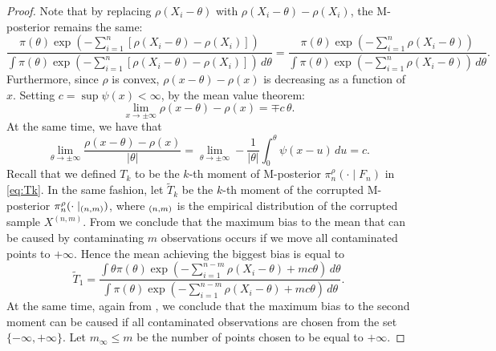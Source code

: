 \documentclass[11pt, oneside]{amsart}
\theoremstyle{definition}   %
\let\P\relax
\newcommand{\P}{\mathbb{P}}
\newcommand{\loss}{\rho}
\newcommand{\mposterior}{\pi_n^{\loss}}
\newcommand{\corruptedsample}{X^{(n,m)}}
\begin{document}
\begin{proof}
    Note that by replacing \( \loss(X_i - \theta)\) with \( \loss(X_i - \theta) - \loss(X_i)\), the M-posterior remains the same:
    \begin{equation}
    \label{eq:diff}
        \frac{\pi(\theta) \exp \left ( - \sum_{i=1}^n [ \loss(X_i - \theta) - \loss(X_i)]  \right )}{\int \pi(\theta) \exp \left ( - \sum_{i=1}^n [ \loss(X_i - \theta) - \loss(X_i)]  \right ) \, d\theta}
        =
        \frac{\pi(\theta) \exp \left ( - \sum_{i=1}^n\loss(X_i - \theta)  \right )}{\int \pi(\theta) \exp \left ( - \sum_{i=1}^n \loss(X_i - \theta)   \right ) \, d\theta}.
    \end{equation}
    Furthermore, since \(\loss\) is convex, \( \loss(x - \theta) - \loss(x)\) is decreasing as a function of \(x\). Setting \( c = \sup \psi(x) < \infty\), by the mean value theorem:
    \[
        \lim_{x \rightarrow \pm \infty} \loss(x - \theta) - \loss(x) = \mp c \, \theta.
    \]
    At the same time, we have that
    \[
        \lim_{\theta \rightarrow \pm \infty} \frac{\loss (x - \theta) - \loss(x)}{| \theta |}
        =
        \lim_{\theta \rightarrow \pm \infty} - \frac{1}{| \theta |} \int_0^\theta \psi(x-u) \, du
        =
        c.
    \]
    Recall that we defined \( T_k\) to be the \(k\)-th moment of M-posterior \( \mposterior (\cdot \mid F_n) \) in \eqref{eq:Tk}. 
    In the same fashion, let  \( \widetilde T_k\) be the \(k\)-th moment of the corrupted M-posterior \( \mposterior (\cdot \mid \P_{(n, m)}) \), where \( \P_{(n, m)} \) is the empirical distribution of the corrupted sample \( \corruptedsample\). 
    From  we conclude that the maximum bias to the mean that can be caused by contaminating \( m \) observations occurs if we move all contaminated points to \( + \infty\). 
    Hence the mean achieving the biggest bias is equal to
    \begin{equation}
        \widetilde T_1 = \frac{\int \theta \pi(\theta) \exp \left (-\sum_{i=1}^{n-m} \rho(X_i - \theta) + mc\theta \right) \, d\theta}{\int \pi(\theta) \exp \left (-\sum_{i=1}^{n-m} \rho(X_i - \theta) + mc\theta\right) \, d\theta}.
    \end{equation}
    At the same time, again from , we conclude that the maximum bias to the second moment can be caused if all contaminated observations are chosen from the set \( \{ -\infty, +\infty \}. \) Let \(m_{\infty} \leq m\) be the number of points chosen to be equal to \( +\infty\).

\end{proof}
\end{document}
